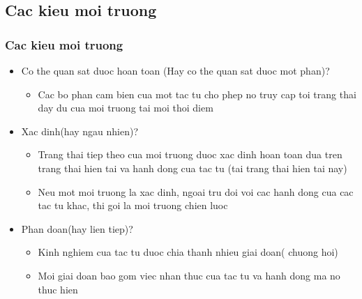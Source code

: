 \documentclass[12pt]{beamer}
\begin{document}
\subsection{Cac kieu moi truong}
\begin{frame}
\frametitle{Cac kieu moi truong}
\begin{itemize}
    \item Co the quan sat duoc hoan toan (Hay co the quan sat duoc mot phan)?\\
    \begin{itemize}
        \item Cac bo phan cam bien cua mot tac tu cho phep no truy cap toi trang thai day du cua moi truong tai moi thoi diem\\
    \end{itemize}
    \item Xac dinh(hay ngau nhien)?\\
    \begin{itemize}
        \item Trang thai tiep theo cua moi truong duoc xac dinh hoan toan dua tren trang thai hien tai va hanh dong cua tac tu (tai trang thai hien tai nay)\\
        \item Neu mot moi truong la xac dinh, ngoai tru doi voi cac hanh dong cua cac tac tu khac, thi goi la moi truong chien luoc\\
    \end{itemize}
    \item Phan doan(hay lien tiep)?\\
    \begin{itemize}
        \item Kinh nghiem cua tac tu duoc chia thanh nhieu giai doan( chuong hoi)\\
        \item Moi giai doan bao gom viec nhan thuc cua tac tu va hanh dong ma no thuc hien\\     
    \end{itemize}
\end{itemize}
\end{frame}
\end{document}
